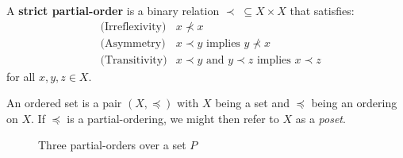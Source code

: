 \begin{definition}
  \label{definition:strict-partial-order}
  A \textbf{strict partial-order}  is a binary relation $\prec \; \subseteq X \times X$ that satisfies:
  \begin{align}
    & \text{(Irreflexivity)} & x \nprec x \\
    & \text{(Asymmetry)} & x \prec y \text{ implies } y \nprec x \\
    & \text{(Transitivity)} & x \prec y \text{ and } y \prec z \text{ implies } x \prec z
  \end{align}
  for all $x,y,z \in X$.
\end{definition}

An ordered set is a pair $(X, \preceq)$ with $X$ being a set and $\preceq$ being an ordering on $X$. If $\preceq$ is a partial-ordering, we might then refer to $X$ as a \textit{poset}.

\begin{figure}[H]
  \label{figure:hasse-diagram}
  \centering
  \begin{subfigure}{0.3\textwidth}
    \centering
    \label{subfigure:partial-order-a}
  \end{subfigure}%
  \begin{subfigure}{0.3\textwidth}
    \centering
    \label{subfigure:partial-order-b}
  \end{subfigure}%
  \begin{subfigure}{0.3\textwidth}
    \centering
    \label{subfigure:partial-order-c}
  \end{subfigure}%
  \caption{Three partial-orders over a set $P$}
\end{figure}


